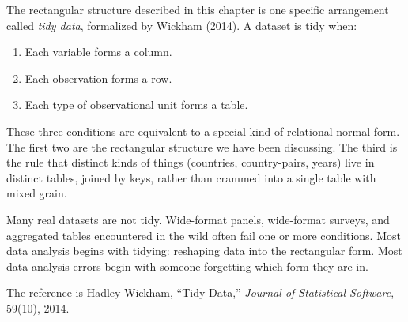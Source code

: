 \documentclass[
  letterpaper,
  11pt,
  twoside,
  openany]{scrbook}
\providecommand{\tightlist}{%
  \setlength{\itemsep}{0pt}\setlength{\parskip}{0pt}}
\begin{document}
\begin{tcolorbox}[enhanced jigsaw, arc=.35mm, bottomrule=.15mm, bottomtitle=1mm, breakable, colback=white, colbacktitle=quarto-callout-note-color!10!white, colframe=quarto-callout-note-color-frame, coltitle=black, left=2mm, leftrule=.75mm, opacityback=0, opacitybacktitle=0.6, rightrule=.15mm, title=\textcolor{quarto-callout-note-color}{\faInfo}\hspace{0.5em}{Inside the math: tidy data, formally}, titlerule=0mm, toprule=.15mm, toptitle=1mm]

The rectangular structure described in this chapter is one specific
arrangement called \emph{tidy data}, formalized by Wickham (2014). A
dataset is tidy when:

\begin{enumerate}
\def\labelenumi{\arabic{enumi}.}
\tightlist
\item
  Each variable forms a column.
\item
  Each observation forms a row.
\item
  Each type of observational unit forms a table.
\end{enumerate}

These three conditions are equivalent to a special kind of relational
normal form. The first two are the rectangular structure we have been
discussing. The third is the rule that distinct kinds of things
(countries, country-pairs, years) live in distinct tables, joined by
keys, rather than crammed into a single table with mixed grain.

Many real datasets are not tidy. Wide-format panels, wide-format
surveys, and aggregated tables encountered in the wild often fail one or
more conditions. Most data analysis begins with tidying: reshaping data
into the rectangular form. Most data analysis errors begin with someone
forgetting which form they are in.

The reference is Hadley Wickham, ``Tidy Data,'' \emph{Journal of
Statistical Software}, 59(10), 2014.

\end{tcolorbox}
\end{document}
